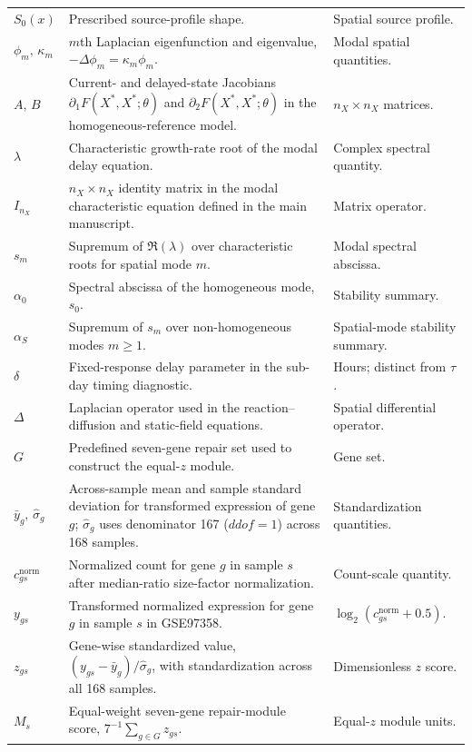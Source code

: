 \documentclass[11pt]{article}
\begin{document}
\begin{longtable}{p{2.4cm}p{8.5cm}p{3.9cm}}
$S_0(x)$ & Prescribed source-profile shape. & Spatial source profile.\\
$\phi_m,\,\kappa_m$ & $m$th Laplacian eigenfunction and eigenvalue, $-\Delta\phi_m=\kappa_m\phi_m$. & Modal spatial quantities.\\
$A,\,B$ & Current- and delayed-state Jacobians $\partial_1F(X^*,X^*;\theta)$ and $\partial_2F(X^*,X^*;\theta)$ in the homogeneous-reference model. & $n_X\times n_X$ matrices.\\
$\lambda$ & Characteristic growth-rate root of the modal delay equation. & Complex spectral quantity.\\
$I_{n_X}$ & $n_X\times n_X$ identity matrix in the modal characteristic equation defined in the main manuscript. & Matrix operator.\\
$s_m$ & Supremum of $\Re(\lambda)$ over characteristic roots for spatial mode $m$. & Modal spectral abscissa.\\
$\alpha_0$ & Spectral abscissa of the homogeneous mode, $s_0$. & Stability summary.\\
$\alpha_S$ & Supremum of $s_m$ over non-homogeneous modes $m\ge1$. & Spatial-mode stability summary.\\
$\delta$ & Fixed-response delay parameter in the sub-day timing diagnostic. & Hours; distinct from $\tau$.\\
$\Delta$ & Laplacian operator used in the reaction--diffusion and static-field equations. & Spatial differential operator.\\
$G$ & Predefined seven-gene repair set used to construct the equal-$z$ module. & Gene set.\\
$\bar{y}_g,\,\widehat{\sigma}_g$ & Across-sample mean and sample standard deviation for transformed expression of gene $g$; $\widehat{\sigma}_g$ uses denominator 167 ($ddof=1$) across 168 samples. & Standardization quantities.\\
$c^{\mathrm{norm}}_{gs}$ & Normalized count for gene $g$ in sample $s$ after median-ratio size-factor normalization. & Count-scale quantity.\\
$y_{gs}$ & Transformed normalized expression for gene $g$ in sample $s$ in GSE97358. & $\log_2(c^{\mathrm{norm}}_{gs}+0.5)$.\\
$z_{gs}$ & Gene-wise standardized value, $(y_{gs}-\bar{y}_g)/\widehat{\sigma}_g$, with standardization across all 168 samples. & Dimensionless $z$ score.\\
$M_s$ & Equal-weight seven-gene repair-module score, $7^{-1}\sum_{g\in G}z_{gs}$. & Equal-$z$ module units.\\

\end{longtable}
\end{document}
